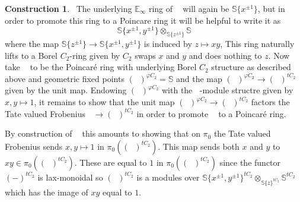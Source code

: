 \documentclass{article}
\DeclareMathOperator{\gmq}{\mathbb{G}_m^\Qoppa}
\renewcommand{\phi}{\varphi}
\theoremstyle{definition}
\newtheorem{construction}[equation]{Construction}
\begin{document}
\begin{construction}~\label{const: gmq}
	The underlying $\mathbb{E}_\infty$ ring of $\gmq$ will again be $\mathbb{S}\{x^{\pm 1}\}$, but in order to promote this ring to a Poincare ring it will be helpful to write it as \[\mathbb{S}\{x^{\pm 1}, y^{\pm 1}\}\otimes_{\mathbb{S}\{z^{\pm 1}\}}\mathbb{S}\] where the map $\mathbb{S}\{z^{\pm 1}\}\to \mathbb{S}\{x^{\pm 1}, y^{\pm 1}\}$ is induced by $z\mapsto xy$, This ring naturally lifts to a Borel $C_2$-ring given by $C_2$ swaps $x$ and $y$ and does nothing to $z$. Now take $\gmq$ to be the Poincar{\'e} ring with underlying Borel $C_2$ structure as described above and geometric fixed points $(\gmq)^{\phi C_2}=\mathbb{S}$ and the map $(\gmq)^{\phi C_2}\to (\gmq)^{tC_2}$ given by the unit map. Endowing $(\gmq)^{\phi C_2}$ with the $\gmq$-module structre given by $x,y\mapsto 1$, it remains to show that the unit map $(\gmq)^{\phi C_2}\to (\gmq)^{tC_2}$ factors the Tate valued Frobenius $\gmq\to (\gmq)^{tC_2}$ in order to promote $\gmq$ to a Poincar{\'e} ring.
	
	By construction of $\gmq$ this amounts to showing that on $\pi_0$ the Tate valued Frobenius sends $x,y\mapsto 1$ in $\pi_0((\gmq)^{tC_2})$. This map sends both $x$ and $y$ to $xy\in \pi_0((\gmq)^{tC_2})$. These are equal to $1$ in $\pi_0((\gmq)^{tC_2})$ since the functor $(-)^{tC_2}$ is lax-monoidal so $(\gmq)^{tC_2}$ is a modules over $\mathbb{S}\{x^{\pm 1}, y^{\pm 1}\}^{tC_2}\otimes_{\mathbb{S}\{z\}^{tC_2}}\mathbb{S}^{tC_2}$ which has the image of $xy$ equal to $1$.
\end{construction}
\end{document}
